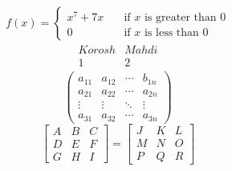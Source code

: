 \documentclass[12pt]{article}
\begin{document}
  
                \[ f(x) =  
                    \begin{cases}  
                     x^7 + 7x       & \quad \text{if } x \text{ is greater than 0}\\ %
                      0  & \quad \text{if } x \text{ is less than 0} %
                    \end{cases}  
               \]
                \vspace{5 em}
               \[
                   \begin{matrix}  
                         \begin{array}{c|c}  
                             Korosh & Mahdi \\   
                             \hline  
                                1 & 2  
                           \end{array}  
                    \end{matrix}  
               \]
               \vspace{5 em}
               \[  
                   \begin{pmatrix} 
                         a_{11} & a_{12} & \cdots & b_{1 n} \\  
                         a_{21} & a_{22} & \cdots & a_{2 n} \\ 
                         \vdots & \vdots & \ddots & \vdots \\  
                         a_{31} & a_{32} & \cdots & a_{3 n}   
                   \end{pmatrix}  
               \] 
               \vspace{5 em}
               \[  
                   \begin{bmatrix}  
                          A & B & C \\  
                          D & E & F \\  
                          G & H & I   
                   \end{bmatrix}  
                    =  
                   \begin{bmatrix*}  
                          J & K & L \\  
                          M & N & O \\  
                           P & Q & R  
                    \end{bmatrix*}  
               \]  
  
        
\end{document}
